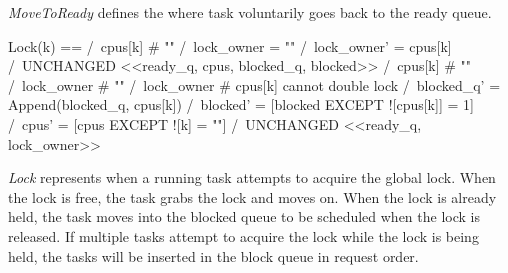 \textit{MoveToReady} defines the where task voluntarily goes back to the ready
queue.\newline

\begin{tla}
Lock(k) == 
    \/  /\ cpus[k] # "" 
        /\ lock_owner = ""
        /\ lock_owner' = cpus[k]
        /\ UNCHANGED <<ready_q, cpus, blocked_q, blocked>> 
    \/  /\ cpus[k] # "" 
        /\ lock_owner # ""
        /\ lock_owner # cpus[k] \* cannot double lock
        /\ blocked_q' = Append(blocked_q, cpus[k])
        /\ blocked' = [blocked EXCEPT ![cpus[k]] = 1]
        /\ cpus' = [cpus EXCEPT ![k] = ""]
        /\ UNCHANGED <<ready_q, lock_owner>>
\end{tla}
\begin{tlatex}
%
%
%
%
%
%
%
%
\@xx{}%
\end{tlatex}
\newline

\textit{Lock} represents when a running task attempts to acquire the global
lock. When the lock is free, the task grabs the lock and moves on. When the lock 
is already held, the task moves into the blocked queue to be scheduled when the lock
is released. If multiple tasks attempt to acquire the lock while the lock is
being held, the tasks will be inserted in the block queue in request order.
\newline

